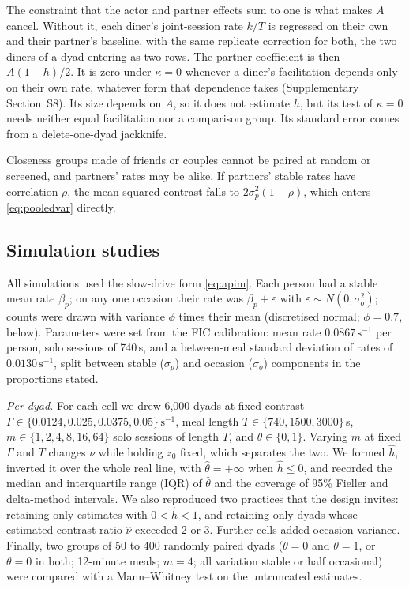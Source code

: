 \documentclass[12pt]{article}
\begin{document}
The constraint that the actor and partner effects sum to one is what makes $A$
cancel. Without it, each diner's joint-session rate $k/T$ is regressed on their
own and their partner's baseline, with the same replicate correction for both,
the two diners of a dyad entering as two rows. The partner coefficient is then
$A(1-h)/2$. It is zero under $\kappa=0$ whenever a diner's facilitation depends
only on their own rate, whatever form that dependence takes (Supplementary
Section~S8). Its size depends on $A$, so it does not estimate $h$, but its test of
$\kappa=0$ needs neither equal facilitation nor a comparison group. Its standard
error comes from a delete-one-dyad jackknife.

Closeness groups made of friends or couples cannot be paired at random or
screened, and partners' rates may be alike. If partners' stable rates have
correlation $\rho$, the mean squared contrast falls to $2\sigma_p^2(1-\rho)$, which
enters \eqref{eq:pooledvar} directly.

\subsection*{Simulation studies}

All simulations used the slow-drive form \eqref{eq:apim}. Each person had a stable
mean rate $\beta_p$; on any one occasion their rate was $\beta_p+\varepsilon$ with
$\varepsilon\sim N(0,\sigma_o^2)$; counts were drawn with variance $\phi$ times
their mean (discretised normal; $\phi=0.7$, below). Parameters were set from the
FIC calibration: mean rate $0.0867\,\mathrm{s}^{-1}$ per person, solo sessions of
740\,s, and a between-meal standard deviation of rates of
$0.0130\,\mathrm{s}^{-1}$, split between stable ($\sigma_p$) and occasion
($\sigma_o$) components in the proportions stated.

\emph{Per-dyad.} For each cell we drew 6{,}000 dyads at fixed contrast
$\Gamma\in\{0.0124,\allowbreak 0.025,\allowbreak 0.0375,\allowbreak 0.05\}\,\mathrm{s}^{-1}$, meal length
$T\in\{740, 1500, 3000\}$\,s, $m\in\{1,\allowbreak2,\allowbreak4,\allowbreak8,\allowbreak16,\allowbreak64\}$ solo sessions of length $T$,
and $\theta\in\{0,1\}$. Varying $m$ at fixed $\Gamma$ and $T$ changes $\nu$ while
holding $z_0$ fixed, which separates the two. We formed $\hat h$, inverted it over
the whole real line, with $\hat\theta=+\infty$ when $\hat h\leq0$, and recorded the
median and interquartile range (IQR) of $\hat\theta$ and the coverage of 95\%
Fieller and delta-method intervals. We also reproduced two practices that the
design invites:
retaining only estimates with $0<\hat h<1$, and retaining only dyads whose
estimated contrast ratio $\hat\nu$ exceeded 2 or 3. Further cells added occasion
variance. Finally, two groups of 50 to 400 randomly paired dyads ($\theta=0$ and
$\theta=1$, or $\theta=0$ in both; 12-minute meals; $m=4$; all variation stable or
half occasional) were compared with a Mann--Whitney test on the untruncated
estimates.
\end{document}
